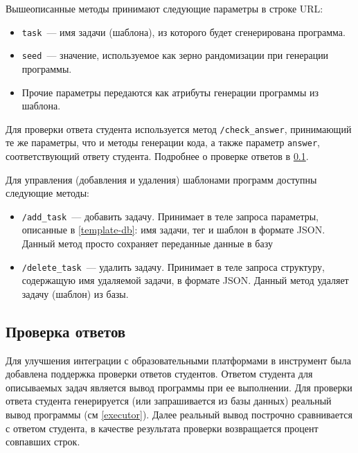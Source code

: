 Вышеописанные методы принимают следующие параметры в строке URL:
\begin{itemize}
    \item \texttt{task}~--- имя задачи (шаблона), из которого будет сгенерирована программа.
    \item \texttt{seed}~--- значение, используемое как зерно рандомизации при генерации программы.
    \item Прочие параметры передаются как атрибуты генерации программы из шаблона.
\end{itemize}

Для проверки ответа студента используется метод \texttt{/check\_answer}, принимающий
те же параметры, что и методы генерации кода, а также параметр \texttt{answer},
соответствующий ответу студента. Подробнее о проверке ответов в \ref{check-answer}.

Для управления (добавления и удаления) шаблонами программ доступны следующие методы:
\begin{itemize}
    \item \texttt{/add\_task}~--- добавить задачу. Принимает в теле запроса параметры, описанные в
          \ref{template-db}: имя задачи, тег и шаблон в формате JSON. Данный метод просто сохраняет
          переданные данные в базу
    \item \texttt{/delete\_task}~--- удалить задачу. Принимает в теле запроса структуру, содержащую
          имя удаляемой задачи, в формате JSON. Данный метод удаляет задачу (шаблон) из базы.

\end{itemize}

\subsection{Проверка ответов} \label{check-answer}

Для улучшения интеграции с образовательными платформами в инструмент была добавлена
поддержка проверки ответов студентов. Ответом студента для описываемых задач
является вывод программы при ее выполнении. Для проверки ответа студента
генерируется (или запрашивается из базы данных) реальный вывод программы
(см \ref{executor}). Далее реальный вывод построчно сравнивается с ответом студента,
в качестве результата проверки возвращается процент совпавших строк.